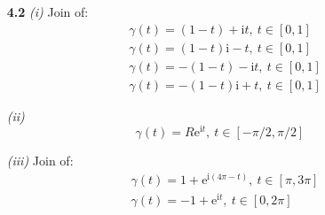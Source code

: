 \begin{enumerate}

\item[\textbf{4.2}] 
\textit{(i)}
Join of: \\
\begin{align*}
&\gamma (t) = (1-t) + \mathrm{i}t, \: t \in [0,1] \\
&\gamma (t) = (1-t)\mathrm{i} - t, \: t \in [0,1] \\
&\gamma (t) = -(1-t) - \mathrm{i}t, \: t \in [0,1] \\
&\gamma (t) = -(1-t)\mathrm{i} + t, \: t \in [0,1]
\end{align*}

\textit{(ii)}
\[\gamma (t) = R\mathrm{e}^{\mathrm{i}t}, \: t \in [-\pi/2,\pi/2] \]

\textit{(iii)}
Join of: \\
\begin{align*}
&\gamma (t) = 1+\mathrm{e}^{\mathrm{i}(4\pi-t)}, \: t \in [\pi,3\pi] \\
&\gamma (t) = -1+\mathrm{e}^{\mathrm{i}t}, \: t \in [0,2\pi] 
\end{align*}

\end{enumerate}